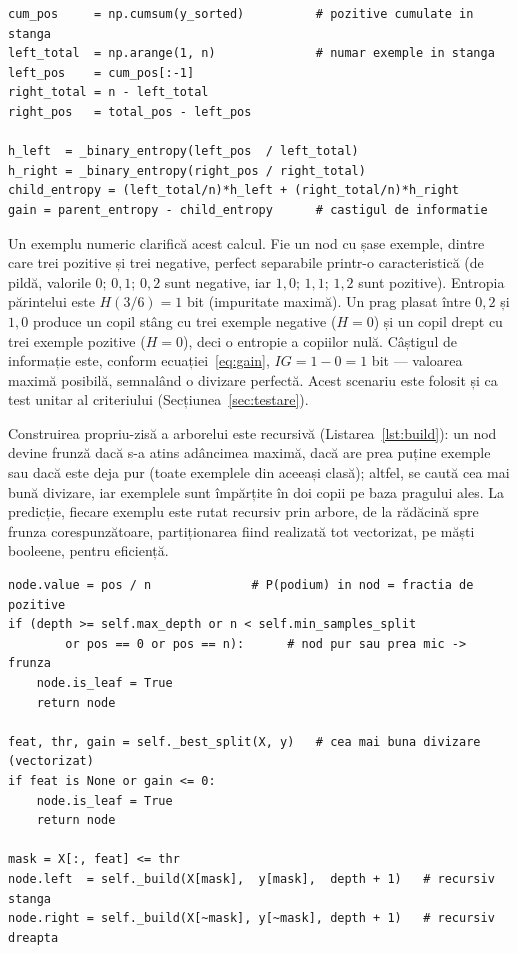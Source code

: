 \documentclass[12pt,a4paper]{report}
\begin{document}
\begin{lstlisting}[caption={Calculul vectorizat al castigului de informatie pentru toate pragurile unei caracteristici.}, label={lst:tree}]
cum_pos     = np.cumsum(y_sorted)          # pozitive cumulate in stanga
left_total  = np.arange(1, n)              # numar exemple in stanga
left_pos    = cum_pos[:-1]
right_total = n - left_total
right_pos   = total_pos - left_pos

h_left  = _binary_entropy(left_pos  / left_total)
h_right = _binary_entropy(right_pos / right_total)
child_entropy = (left_total/n)*h_left + (right_total/n)*h_right
gain = parent_entropy - child_entropy      # castigul de informatie
\end{lstlisting}

Un exemplu numeric clarifică acest calcul. Fie un nod cu șase exemple, dintre care trei pozitive și
trei negative, perfect separabile printr-o caracteristică (de pildă, valorile $0;\,0{,}1;\,0{,}2$
sunt negative, iar $1{,}0;\,1{,}1;\,1{,}2$ sunt pozitive). Entropia părintelui este
$H(3/6) = 1$ bit (impuritate maximă). Un prag plasat între $0{,}2$ și $1{,}0$ produce un copil
stâng cu trei exemple negative ($H = 0$) și un copil drept cu trei exemple pozitive ($H = 0$),
deci o entropie a copiilor nulă. Câștigul de informație este, conform ecuației~\eqref{eq:gain},
$IG = 1 - 0 = 1$ bit --- valoarea maximă posibilă, semnalând o divizare perfectă. Acest scenariu
este folosit și ca test unitar al criteriului (Secțiunea~\ref{sec:testare}).

Construirea propriu-zisă a arborelui este recursivă (Listarea~\ref{lst:build}): un nod devine
frunză dacă s-a atins adâncimea maximă, dacă are prea puține exemple sau dacă este deja pur (toate
exemplele din aceeași clasă); altfel, se caută cea mai bună divizare, iar exemplele sunt împărțite
în doi copii pe baza pragului ales. La predicție, fiecare exemplu este rutat recursiv prin arbore,
de la rădăcină spre frunza corespunzătoare, partiționarea fiind realizată tot vectorizat, pe măști
booleene, pentru eficiență.

\begin{lstlisting}[caption={Conditiile de oprire si recursivitatea construirii arborelui.}, label={lst:build}]
node.value = pos / n              # P(podium) in nod = fractia de pozitive
if (depth >= self.max_depth or n < self.min_samples_split
        or pos == 0 or pos == n):      # nod pur sau prea mic -> frunza
    node.is_leaf = True
    return node

feat, thr, gain = self._best_split(X, y)   # cea mai buna divizare (vectorizat)
if feat is None or gain <= 0:
    node.is_leaf = True
    return node

mask = X[:, feat] <= thr
node.left  = self._build(X[mask],  y[mask],  depth + 1)   # recursiv stanga
node.right = self._build(X[~mask], y[~mask], depth + 1)   # recursiv dreapta
\end{lstlisting}
\end{document}
